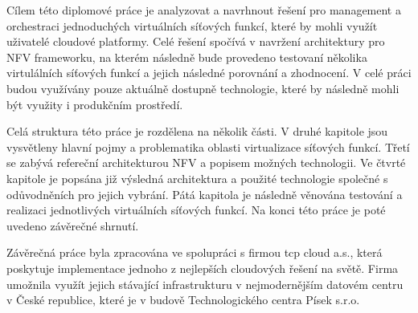 Cílem této diplomové práce je analyzovat a navrhnout řešení pro management a orchestraci jednoduchých virtuálních síťových funkcí, které by mohli využít uživatelé cloudové platformy. Celé řešení spočívá v navržení architektury pro NFV frameworku, na kterém následně bude provedeno testovaní několika virtulálních síťových funkcí a jejich následné porovnání a zhodnocení. V celé práci budou využívány pouze aktuálně dostupně technologie, které by následně mohli být využity i produkčním prostředí.

Celá struktura této práce je rozdělena na několik části. V druhé kapitole jsou vysvětleny hlavní pojmy a problematika oblasti virtualizace síťových funkcí. Třetí se zabývá refereční architekturou NFV a popisem možných technologii. Ve čtvrté kapitole je popsána již výsledná architektura a použité technologie společné s odůvodněních pro jejich vybrání. Pátá kapitola je následně věnována testování a realizaci jednotlivých virtuálních síťových funkcí. Na konci této práce je poté uvedeno závěrečné shrnutí.

Závěrečná práce byla zpracována ve spolupráci s firmou tcp cloud a.s., která poskytuje implementace jednoho z nejlepších cloudových řešení na světě. Firma umožnila využít jejich stávající infrastrukturu v nejmodernějším datovém centru v České republice, které je v budově Technologického centra Písek s.r.o.